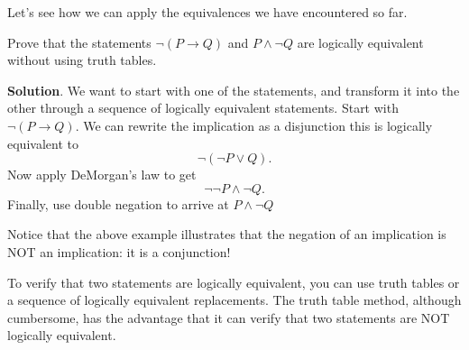 \documentclass[11pt,]{book}
\theoremstyle{ptxplainnotitle}
\theoremstyle{ptxplaintitle}
\theoremstyle{ptxdefinitionnotitle}
\theoremstyle{ptxdefinitiontitle}
\theoremstyle{ptxdefinitionnotitle}
\theoremstyle{ptxdefinitiontitle}
\theoremstyle{ptxdefinitionnotitle}
\theoremstyle{ptxdefinitiontitle}
\theoremstyle{ptxdefinitiontitlenonumber}
\theoremstyle{ptxdefinitiontitlenonumber}
\numberwithin{equation}{chapter}
\newcommand{\imp}{\rightarrow}
\begin{document}
\hypertarget{p-2282}{}%
Let's see how we can apply the equivalences we have encountered so far.%
\begin{example}\label{example-59}
\hypertarget{p-2283}{}%
Prove that the statements \(\neg(P \imp Q)\) and \(P\wedge \neg Q\) are logically equivalent without using truth tables.%
\par\smallskip%
\noindent\textbf{Solution}.\hypertarget{solution-235}{}\quad%
\hypertarget{p-2284}{}%
We want to start with one of the statements, and transform it into the other through a sequence of logically equivalent statements. Start with \(\neg(P \imp Q)\). We can rewrite the implication as a disjunction this is logically equivalent to%
\begin{equation*}
\neg(\neg P \vee Q).
\end{equation*}
Now apply DeMorgan's law to get%
\begin{equation*}
\neg\neg P \wedge \neg Q.
\end{equation*}
Finally, use double negation to arrive at \(P \wedge \neg Q\)%
\end{example}
\hypertarget{p-2285}{}%
Notice that the above example illustrates that the negation of an implication is NOT an implication: it is a conjunction!%
\par
\hypertarget{p-2286}{}%
To verify that two statements are logically equivalent, you can use truth tables or a sequence of logically equivalent replacements. The truth table method, although cumbersome, has the advantage that it can verify that two statements are NOT logically equivalent.%
\end{document}
